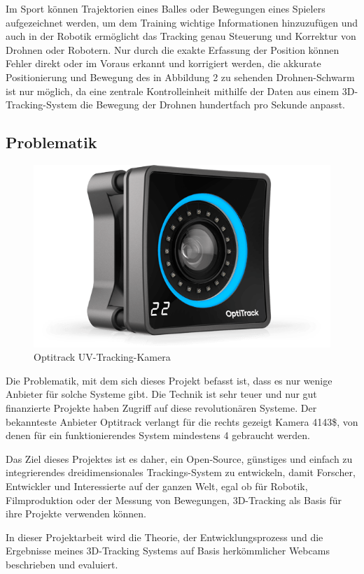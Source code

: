 \documentclass[12pt, ngerman]{article}
\begin{document}
Im Sport können Trajektorien eines Balles oder Bewegungen eines Spielers aufgezeichnet werden, um dem Training wichtige Informationen hinzuzufügen und auch in der Robotik ermöglicht das Tracking genau Steuerung und Korrektur von Drohnen oder Robotern. Nur durch die exakte Erfassung der Position können Fehler direkt oder im Voraus erkannt und korrigiert werden, die akkurate Positionierung und Bewegung des in Abbildung 2 zu sehenden Drohnen-Schwarm ist nur möglich, da eine zentrale Kontrolleinheit mithilfe der Daten aus einem 3D-Tracking-System die Bewegung der Drohnen hundertfach pro Sekunde anpasst. 
\subsection{Problematik}
\begin{figure}
\centering
  \vspace{-40pt}
  {\setlength{\belowcaptionskip}{-20pt}
    \includegraphics[angle=0,width=\linewidth]{4143.png}
    \caption{Optitrack UV-Tracking-Kamera}
  }
\end{figure}
Die Problematik, mit dem sich dieses Projekt befasst ist, dass es nur wenige Anbieter für solche Systeme gibt. Die Technik ist sehr teuer und nur gut finanzierte Projekte haben Zugriff auf diese revolutionären Systeme. Der bekannteste Anbieter Optitrack verlangt für die rechts gezeigt Kamera 4143\$, von denen für ein funktionierendes System mindestens 4 gebraucht werden. 

Das Ziel dieses Projektes ist es daher, ein Open-Source, günstiges und einfach zu integrierendes dreidimensionales Trackings-System zu entwickeln, damit Forscher, Entwickler und Interessierte auf der ganzen Welt, egal ob für Robotik, Filmproduktion oder der Messung von Bewegungen, 3D-Tracking als Basis für ihre Projekte verwenden können. \par
In dieser Projektarbeit wird die Theorie, der Entwicklungsprozess und die Ergebnisse meines 3D-Tracking Systems auf Basis herkömmlicher Webcams beschrieben und evaluiert.  
\newpage
\end{document}
